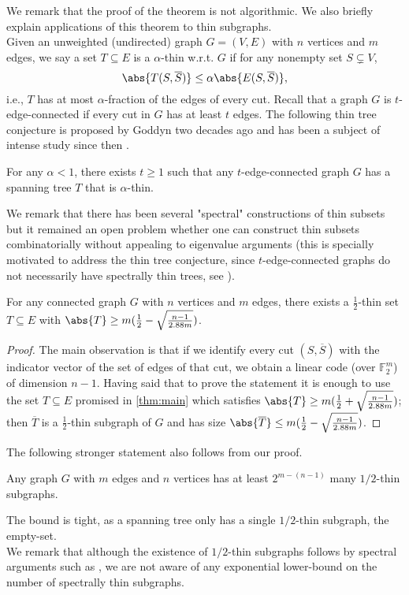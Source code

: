 \documentclass[12pt]{article}
\newcommand{\gk}{t} %
\begin{document}
We remark that the proof of the theorem is not algorithmic. 
We also briefly explain applications of this theorem to thin subgraphs. 
\\
Given an unweighted (undirected) graph $G=(V,E)$ with $n$ vertices and $m$ edges,
we say a set $T\subseteq E$ is a $\alpha$-thin w.r.t. $G$ if for any nonempty set $S\subsetneq V$,
$$ \abs{T(S,\overline{S})} \leq \alpha \abs{E(S,\overline{S})},$$
i.e., $T$ has at most $\alpha$-fraction of the edges of every cut. Recall that a graph $G$ is $\gk$-edge-connected if every cut in $G$ has at least $\gk$ edges.
The following thin tree conjecture is proposed by Goddyn two decades ago \cite{God04} and has been a subject of intense study since then \cite{AGMOS10,OS11,HO14,AO15,MP19,Mou19,Alg23, KO23}.
\begin{conj}
    For any $\alpha<1$, there exists $\gk\geq 1$ such that any $\gk$-edge-connected graph $G$ has a spanning tree $T$ that is $\alpha$-thin. 
\end{conj}
We remark that there has been several "spectral" constructions of thin subsets but it remained an open problem whether one can construct thin subsets combinatorially without appealing to eigenvalue arguments (this is specially motivated to address the thin tree conjecture, since $\gk$-edge-connected graphs do not necessarily have spectrally thin trees, see \cite{AO15}).

\begin{cor}
    For any connected graph $G$ with $n$ vertices and $m$ edges, there exists a $\frac12$-thin set $T\subseteq E$ with $\abs{T}\geq m(\frac12-\sqrt{\frac{n-1}{2.88m}})$.
\end{cor}
\begin{proof}
The main observation is that if we identify every cut $(S,\overline{S})$ with the indicator vector of the set of edges of that cut, we obtain a linear code (over $\mathbb{F}_2^m$) of dimension $n-1$. 
Having said that to prove the statement it is enough to use the set $T\subseteq E$ promised in \cref{thm:main} which satisfies $\abs{T}\geq m(\frac12+\sqrt{\frac{n-1}{2.88m}})$; then $\overline{T}$ is a $\frac12$-thin subgraph of $G$ and has size $\abs{\overline{T}}\leq m(\frac12-\sqrt{\frac{n-1}{2.88m}})$. 
\end{proof}

The following stronger statement also follows from our proof.
\begin{thm}
    Any graph $G$ with $m$ edges and $n$ vertices has at least $2^{m-(n-1)}$ many $1/2$-thin subgraphs.
\end{thm}
The bound is tight, as a spanning tree only has a single $1/2$-thin subgraph, the empty-set.
\\
We remark that although the existence of $1/2$-thin subgraphs follows by spectral arguments such as \cite{BSS14}, we are not aware of any exponential lower-bound on the number of spectrally thin subgraphs.
\end{document}
